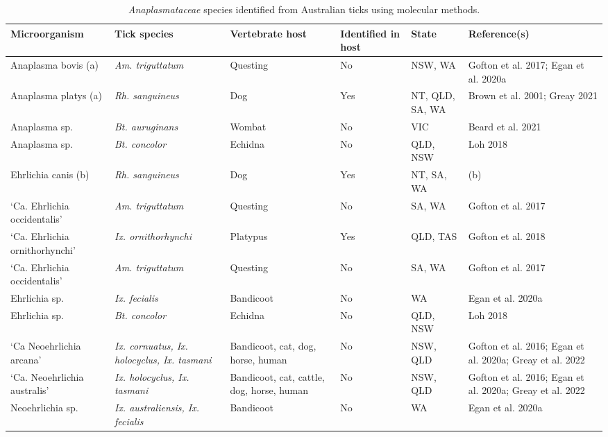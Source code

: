 \documentclass[a4paper, nobind]{templates/ociamthesis}
\begin{document}
\begin{table}

\caption[\textit{Anaplasmataceae} species identified from Australian ticks.]{\label{tab:T1anaplasm}\textit{Anaplasmataceae} species identified from Australian ticks using molecular methods.}
\centering
\fontsize{8}{10}\selectfont
\begin{threeparttable}
\begin{tabular}[t]{>{\raggedright\arraybackslash}p{10em}>{\raggedright\arraybackslash}p{10em}>{\raggedright\arraybackslash}p{8em}>{\raggedright\arraybackslash}p{6em}>{\raggedright\arraybackslash}p{6em}>{\raggedright\arraybackslash}p{6em}}
\toprule
Microorganism & Tick species & Vertebrate host & Identified in host & State & Reference(s)\\
\midrule
Anaplasma bovis (a) & \em{Am. triguttatum} & Questing & No & NSW, WA & Gofton et al. 2017; Egan et al. 2020a\\
Anaplasma platys (a) & \em{Rh. sanguineus} & Dog & Yes & NT, QLD, SA, WA & Brown et al. 2001; Greay 2021\\
Anaplasma sp. & \em{Bt. auruginans} & Wombat & No & VIC & Beard et al. 2021\\
Anaplasma sp. & \em{Bt. concolor} & Echidna & No & QLD, NSW & Loh 2018\\
Ehrlichia canis (b) & \em{Rh. sanguineus} & Dog & Yes & NT, SA, WA & (b)\\
‘Ca. Ehrlichia occidentalis’ & \em{Am. triguttatum} & Questing & No & SA, WA & Gofton et al. \vphantom{1} 2017\\
‘Ca. Ehrlichia ornithorhynchi’ & \em{Ix. ornithorhynchi} & Platypus & Yes & QLD, TAS & Gofton et al. 2018\\
‘Ca. Ehrlichia occidentalis’ & \em{Am. triguttatum} & Questing & No & SA, WA & Gofton et al. 2017\\
Ehrlichia sp. & \em{Ix. fecialis} & Bandicoot & No & WA & Egan et al. 2020a\\
Ehrlichia sp. & \em{Bt. concolor} & Echidna & No & QLD, NSW & Loh 2018\\
‘Ca Neoehrlichia arcana’ & \em{Ix. cornuatus, Ix. holocyclus, Ix. tasmani} & Bandicoot, cat, dog, horse, human & No & NSW, QLD & Gofton et al. 2016; Egan et al. 2020a; Greay et al. 2022\\
‘Ca. Neoehrlichia australis’ & \em{Ix. holocyclus, Ix. tasmani} & Bandicoot, cat, cattle, dog, horse, human & No & NSW, QLD & Gofton et al. 2016; Egan et al. 2020a; Greay et al. 2022\\
Neoehrlichia sp. & \em{Ix. australiensis, Ix. fecialis} & Bandicoot & No & WA & Egan et al. 2020a\\

\end{tabular}
\end{threeparttable}
\end{table}
\end{document}
